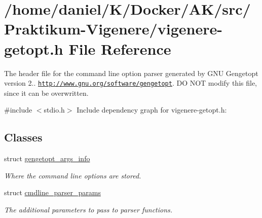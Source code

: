 \hypertarget{vigenere-getopt_8h}{}\section{/home/daniel/\+K/\+Docker/\+A\+K/src/\+Praktikum-\/\+Vigenere/vigenere-\/getopt.h File Reference}
\label{vigenere-getopt_8h}


The header file for the command line option parser generated by G\+NU Gengetopt version 2.. \href{http://www.gnu.org/software/gengetopt}{\tt http\+://www.\+gnu.\+org/software/gengetopt}. DO N\+OT modify this file, since it can be overwritten.  


{\ttfamily \#include $<$stdio.\+h$>$}\newline
Include dependency graph for vigenere-\/getopt.h\+:
\subsection*{Classes}
\begin{DoxyCompactItemize}
\item 
struct \hyperlink{structgengetopt__args__info}{gengetopt\+\_\+args\+\_\+info}
\begin{DoxyCompactList}\small\item\em Where the command line options are stored. \end{DoxyCompactList}\item 
struct \hyperlink{structcmdline__parser__params}{cmdline\+\_\+parser\+\_\+params}
\begin{DoxyCompactList}\small\item\em The additional parameters to pass to parser functions. \end{DoxyCompactList}\end{DoxyCompactItemize}
